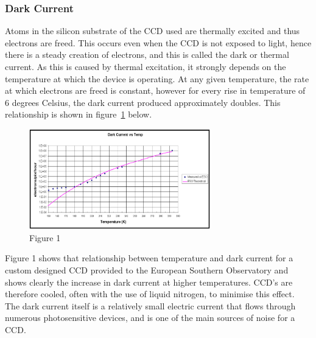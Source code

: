	\subsubsection{Dark Current} %
	\label{ssub:dark_current}
		Atoms in the silicon substrate of the CCD used are thermally excited and thus electrons are freed. This occurs even when the CCD is not exposed to light, hence there is a steady creation of electrons, and this is called the dark or thermal current. As this is caused by thermal excitation, it strongly depends on the temperature at which the device is operating. At any given temperature, the rate at which electrons are freed is constant, however for every rise in temperature of 6 degrees Celsius, the dark current produced approximately doubles\cite[pages~124--125]{Astronomical_Image_Processing}. This relationship is shown in figure~\ref{fig:dark_current} below\cite{Southern_Observatory_throughput}.
		\begin{figure}[ht]
			\centering
			\includegraphics[width=0.7\textwidth]{../Images/Dark.png}
			\caption{Figure 1}\label{fig:dark_current}
		\end{figure}

		Figure 1 shows that relationship between temperature and dark current for a custom designed CCD provided to the European Southern Observatory and shows clearly the increase in dark current at higher temperatures. CCD’s are therefore cooled, often with the use of liquid nitrogen, to minimise this effect. The dark current itself is a relatively small electric current that flows through numerous photosensitive devices, and is one of the main sources of noise for a CCD.

